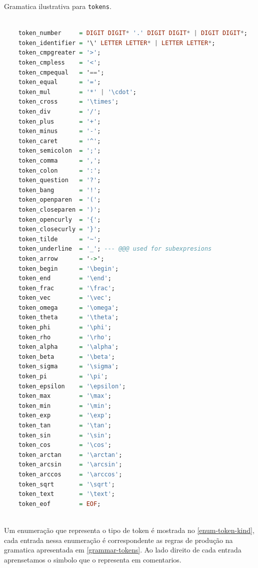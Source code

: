 \begin{codigo}[htb]
    \caption{\small Gramatica ilustrativa para \texttt{tokens}. }
        \label{grammar-tokens}
  \begin{lstlisting}[numbers=none, frame=none, language=haskell]

    token_number     = DIGIT DIGIT* '.' DIGIT DIGIT* | DIGIT DIGIT*;
    token_identifier = '\' LETTER LETTER* | LETTER LETTER*;
    token_cmpgreater = '>';
    token_cmpless    = '<';
    token_cmpequal   = '==';
    token_equal      = '=';
    token_mul        = '*' | '\cdot';
    token_cross      = '\times';
    token_div        = '/';
    token_plus       = '+';
    token_minus      = '-';
    token_caret      = '^';
    token_semicolon  = ';';
    token_comma      = ',';
    token_colon      = ':';
    token_question   = '?';
    token_bang       = '!';
    token_openparen  = '(';
    token_closeparen = ')';
    token_opencurly  = '{';
    token_closecurly = '}';
    token_tilde      = '~';
    token_underline  = '_'; --- @@@ used for subexpresions
    token_arrow      = '->';
    token_begin      = '\begin';
    token_end        = '\end';
    token_frac       = '\frac';
    token_vec        = '\vec';
    token_omega      = '\omega';
    token_theta      = '\theta';
    token_phi        = '\phi';
    token_rho        = '\rho';
    token_alpha      = '\alpha';
    token_beta       = '\beta';
    token_sigma      = '\sigma';
    token_pi         = '\pi';
    token_epsilon    = '\epsilon';
    token_max        = '\max';
    token_min        = '\min';
    token_exp        = '\exp';
    token_tan        = '\tan';
    token_sin        = '\sin';
    token_cos        = '\cos';
    token_arctan     = '\arctan';
    token_arcsin     = '\arcsin';
    token_arccos     = '\arccos';
    token_sqrt       = '\sqrt';
    token_text       = '\text';
    token_eof        = EOF;
    
  \end{lstlisting}
\end{codigo}


Um enumeração que representa o tipo de token é mostrada no \autoref{enum-token-kind}, cada entrada nessa enumeração é correspondente as regras de produção na gramatica apresentada em \autoref{grammar-tokens}. Ao lado direito de cada entrada aprensetamos o simbolo que o representa em comentarios.

